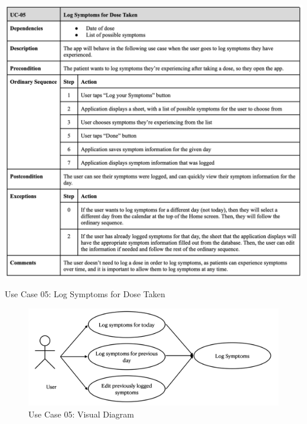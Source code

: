 \begin{table} [H]
    \centering
    \includegraphics[width=1\linewidth]{uc-05.png}
    \caption{Use Case 05: Log Symptoms for Dose Taken}
    \label{fig:uc05-table}
\end{table}

\begin{figure} [H]
    \centering
    \includegraphics[width=0.75\linewidth]{thesis//chapters//images/uc-05-visual.png}
    \caption{Use Case 05: Visual Diagram}
    \label{fig:uc05-visual-diagram}
\end{figure}

